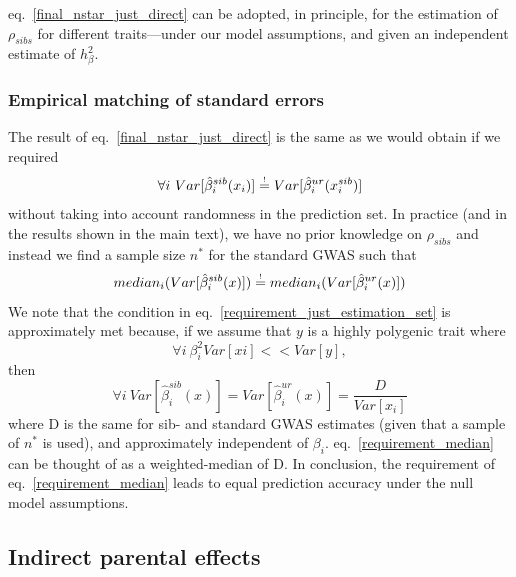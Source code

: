 \documentclass[hidelinks, 12pt]{article}
\begin{document}
eq.~\ref{final_nstar_just_direct} can be adopted, in principle, for the estimation of $\rho_{sibs}$ for different traits---under our model assumptions, and given an independent estimate of $h_{\beta}^2.$

\subsubsection{Empirical matching of standard errors}
\label{Empiricalmatchingofstandarderrors}
The result of eq.~\ref{final_nstar_just_direct} is the same as we would obtain if we required 
\begin{equation}
\label{requirement_just_estimation_set}
\forall i~Var[\hat{\beta}_i^{sib}(x_i)] \reqeq Var[\hat{\beta}_i^{ur}(x_i^{sib})]
\end{equation}
without taking  into account randomness in the prediction set.  In practice (and in the results shown in the main text), we have no prior knowledge on $\rho_{sibs}$ and instead we find a sample size $n^*$ for the standard GWAS such that
\begin{equation}
\label{requirement_median}
median_i(Var[\hat{\beta}_i^{sib}(x)]) \reqeq median_i(Var[\hat{\beta}_i^{ur}(x)])
\end{equation}
We note that the condition in eq.~\ref{requirement_just_estimation_set} is approximately met because, if we assume that $y$ is a highly polygenic trait where
$$ \forall i~\beta_i^2Var[xi] << Var[y],$$
then 
$$\forall i~Var[\hat{\beta}_i^{sib}(x)]=Var[\hat{\beta}_i^{ur}(x)]=\frac{D}{Var[x_i]}$$
where D is the same for sib- and standard GWAS estimates (given that a sample of $n^*$ is used), and approximately independent of $\beta_i$.  eq.~\ref{requirement_median} can be thought of as a weighted-median of D. In conclusion, the requirement of eq.~\ref{requirement_median} leads to equal prediction accuracy under the null model assumptions.

\pagebreak

\subsection{Indirect parental effects}
\end{document}
